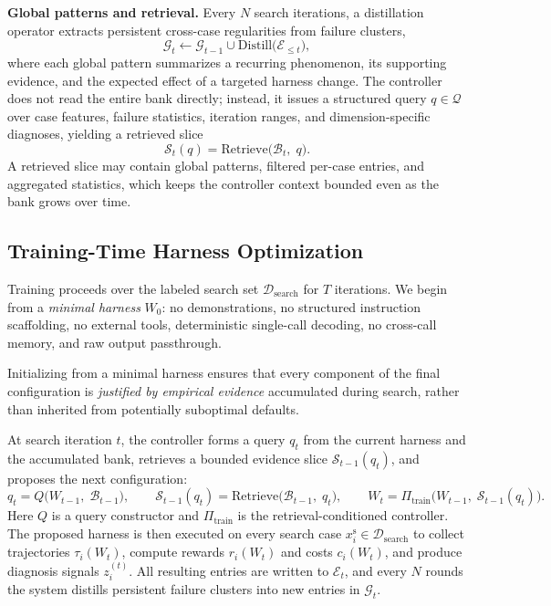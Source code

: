 \documentclass{article}
\newcommand{\methodlabel}[1]{\noindent\textbf{\textcolor{narrareddeep}{#1}}}
\begin{document}
\methodlabel{Global patterns and retrieval.}
Every $N$ search iterations, a distillation operator extracts persistent
cross-case regularities from failure clusters,
\begin{equation}
\label{eq:distill}
\mathcal{G}_t
\leftarrow
\mathcal{G}_{t-1}
\cup
\mathrm{Distill}\!\bigl(\mathcal{E}_{\leq t}\bigr),
\end{equation}
where each global pattern summarizes a recurring phenomenon, its supporting
evidence, and the expected effect of a targeted harness change. The controller
does not read the entire bank directly; instead, it issues a structured query
$q \in \mathcal{Q}$ over case features, failure statistics, iteration ranges,
and dimension-specific diagnoses, yielding a retrieved slice
\begin{equation}
\label{eq:retrieve}
\mathcal{S}_t(q)
=
\mathrm{Retrieve}\!\bigl(\mathcal{B}_t,\; q\bigr).
\end{equation}
A retrieved slice may contain global patterns, filtered per-case entries, and
aggregated statistics, which keeps the controller context bounded even as the
bank grows over time.

\subsection{Training-Time Harness Optimization}
\label{sec:training}

Training proceeds over the labeled search set
$\mathcal{D}_{\mathrm{search}}$ for $T$ iterations. We begin from a
\emph{minimal harness} $W_0$: no demonstrations,
no structured instruction scaffolding, no external tools, deterministic
single-call decoding, no cross-call memory, and raw output passthrough.

\begin{insightbox}[title={Starting from scratch}]
Initializing from a minimal harness ensures that every component of the final
configuration is \emph{justified by empirical evidence} accumulated during
search, rather than inherited from potentially suboptimal defaults.
\end{insightbox}

\noindent
At search iteration $t$, the controller forms a query $q_t$ from the current
harness and the accumulated bank, retrieves a bounded evidence slice
$\mathcal{S}_{t-1}(q_t)$, and proposes the next configuration:
\begin{equation}
\label{eq:controller}
q_t = Q\!\bigl(W_{t-1},\; \mathcal{B}_{t-1}\bigr),
\qquad
\mathcal{S}_{t-1}(q_t)
=
\mathrm{Retrieve}\!\bigl(\mathcal{B}_{t-1},\; q_t\bigr),
\qquad
W_t
=
\Pi_{\mathrm{train}}\!\bigl(W_{t-1},\; \mathcal{S}_{t-1}(q_t)\bigr).
\end{equation}
Here $Q$ is a query constructor and $\Pi_{\mathrm{train}}$ is the
retrieval-conditioned controller. The proposed harness is then executed on
every search case $x_i^{\mathrm{s}} \in \mathcal{D}_{\mathrm{search}}$ to
collect trajectories $\tau_i(W_t)$, compute rewards $r_i(W_t)$ and costs
$c_i(W_t)$, and produce diagnosis signals $z_i^{(t)}$. All resulting entries
are written to $\mathcal{E}_t$, and every $N$ rounds the system distills
persistent failure clusters into new entries in $\mathcal{G}_t$.
\end{document}
